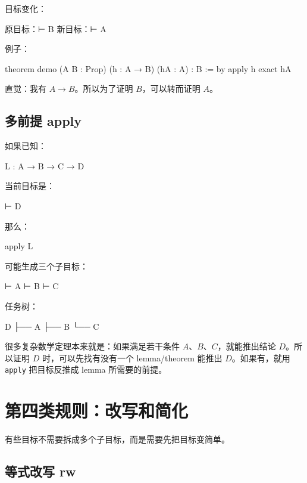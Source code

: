 \documentclass[UTF8,12pt]{ctexart}
\begin{document}
目标变化：

\begin{Tree}
原目标：⊢ B
新目标：⊢ A
\end{Tree}

例子：

\begin{LeanCode}
theorem demo
  (A B : Prop)
  (h : A → B)
  (hA : A) :
  B := by
  apply h
  exact hA
\end{LeanCode}

直觉：我有 \(A \to B\)。所以为了证明 \(B\)，可以转而证明 \(A\)。

\subsection{多前提 apply}

如果已知：

\begin{LeanCode}
L : A → B → C → D
\end{LeanCode}

当前目标是：

\begin{LeanCode}
⊢ D
\end{LeanCode}

那么：

\begin{LeanCode}
apply L
\end{LeanCode}

可能生成三个子目标：

\begin{LeanCode}
⊢ A
⊢ B
⊢ C
\end{LeanCode}

任务树：

\begin{Tree}
D
├── A
├── B
└── C
\end{Tree}

很多复杂数学定理本来就是：如果满足若干条件 \(A\)、\(B\)、\(C\)，就能推出结论 \(D\)。所以证明 \(D\) 时，可以先找有没有一个 lemma/theorem 能推出 \(D\)。如果有，就用 \texttt{apply} 把目标反推成 lemma 所需要的前提。

\section{第四类规则：改写和简化}

有些目标不需要拆成多个子目标，而是需要先把目标变简单。

\subsection{等式改写 rw}
\end{document}
